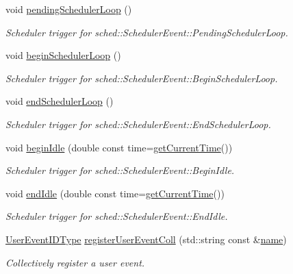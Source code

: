 \begin{DoxyCompactItemize}
void \hyperlink{structvt_1_1trace_1_1_trace_a5552347220b63160248f1ff5f14845f3}{pending\+Scheduler\+Loop} ()
\begin{DoxyCompactList}\small\item\em Scheduler trigger for {\ttfamily sched\+::\+Scheduler\+Event\+::\+Pending\+Scheduler\+Loop}. \end{DoxyCompactList}\item 
void \hyperlink{structvt_1_1trace_1_1_trace_a0e6566503861138843e7dc0a9ba30180}{begin\+Scheduler\+Loop} ()
\begin{DoxyCompactList}\small\item\em Scheduler trigger for {\ttfamily sched\+::\+Scheduler\+Event\+::\+Begin\+Scheduler\+Loop}. \end{DoxyCompactList}\item 
void \hyperlink{structvt_1_1trace_1_1_trace_ad7ee4fc8c75874a524ce7cc1501209fd}{end\+Scheduler\+Loop} ()
\begin{DoxyCompactList}\small\item\em Scheduler trigger for {\ttfamily sched\+::\+Scheduler\+Event\+::\+End\+Scheduler\+Loop}. \end{DoxyCompactList}\item 
void \hyperlink{structvt_1_1trace_1_1_trace_a530af1b7b48cf389744325f6f7e7f05e}{begin\+Idle} (double const time=\hyperlink{structvt_1_1trace_1_1_trace_a04cf6b76b4ced1bc90d246a34c948db5}{get\+Current\+Time}())
\begin{DoxyCompactList}\small\item\em Scheduler trigger for {\ttfamily sched\+::\+Scheduler\+Event\+::\+Begin\+Idle}. \end{DoxyCompactList}\item 
void \hyperlink{structvt_1_1trace_1_1_trace_a0262f4025460c9d61cac60420e75ef77}{end\+Idle} (double const time=\hyperlink{structvt_1_1trace_1_1_trace_a04cf6b76b4ced1bc90d246a34c948db5}{get\+Current\+Time}())
\begin{DoxyCompactList}\small\item\em Scheduler trigger for {\ttfamily sched\+::\+Scheduler\+Event\+::\+End\+Idle}. \end{DoxyCompactList}\item 
\hyperlink{namespacevt_1_1trace_a5908920d051c144c89f17c69ed262350}{User\+Event\+I\+D\+Type} \hyperlink{structvt_1_1trace_1_1_trace_a9a106f7f39e605745994d20bb526f8cf}{register\+User\+Event\+Coll} (std\+::string const \&\hyperlink{structvt_1_1trace_1_1_trace_aaae4bbf6d009229a5c8b9db67a127942}{name})
\begin{DoxyCompactList}\small\item\em Collectively register a user event. \end{DoxyCompactList}\item 

\end{DoxyCompactItemize}
